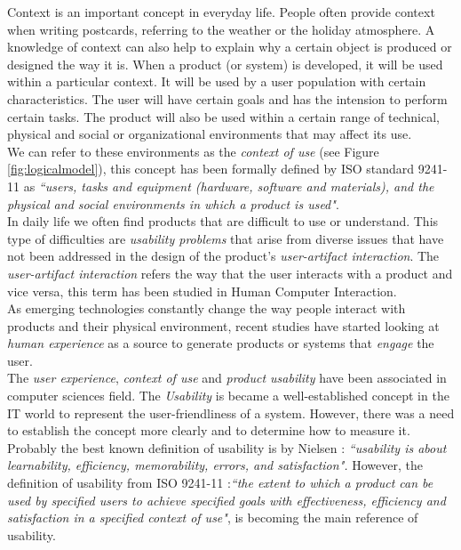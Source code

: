 Context is an important concept in everyday life. People often provide
context when writing postcards, referring to the weather or the holiday
atmosphere. A knowledge of context can also help to explain why a certain
object is produced or designed the way it is. When a product 
(or system) is developed, it
will be used within a particular context. It will be used by a user
population with certain characteristics. The user will have certain
goals and has the intension to perform certain tasks. The product will also be used
within a certain range of technical, physical and social or
organizational environments \cite{maguire2001context} that may affect
its use.\\   
We can refer to these environments as the \textit{context of use} (see
Figure \ref{fig:logicalmodel}), this concept has been formally defined
by ISO standard 9241-11 \cite{international1998iso} as \textit{``users,
tasks and equipment (hardware, software and materials), and the
physical and social environments in which a product is used"}. \\ 
In daily life we often find products that are difficult to use or
understand. This type of difficulties are \textit{usability problems}
that arise from  diverse issues that have not been addressed in the
design of the product's \textit{user-artifact interaction}. The
\textit{user-artifact interaction} refers the way that the user
interacts with a product and vice versa, this term has been studied
in Human Computer Interaction. \\As emerging technologies constantly
change the way people interact with products and their physical
environment, recent studies have started looking at \textit{human
experience} as a source to generate products or systems that
\textit{engage} the user.\\
The \textit{user experience}, \textit{context of use} and
\textit{product usability} have been associated in computer sciences
field. The \textit{Usability} is became a well-established concept in
the IT world to represent the user-friendliness of a system. However,
there was a need to establish the concept more clearly and to
determine how to measure it. Probably the best known definition of
usability is by Nielsen \cite{nielsen1994usability}: 
\textit{``usability is about learnability, efficiency, 
memorability, errors, and satisfaction".}
However, the definition of usability from ISO
9241-11 \cite{international1998iso}:\textit{``the extent to which a
product can be used by specified users to achieve specified  goals
with effectiveness, efficiency and satisfaction in a  specified
context of use"}, is becoming the main reference of usability. \\
